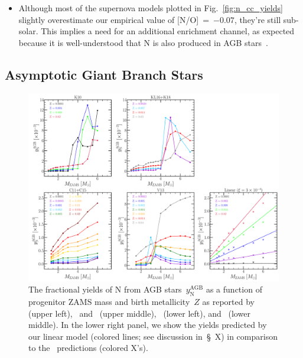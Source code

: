 \documentclass[ms.tex]{subfiles}
\begin{document}
\begin{itemize}
	\item Although most of the supernova models plotted in 
	Fig.~\ref{fig:n_cc_yields} slightly overestimate our empirical value of 
	[N/O]\subcc~=~$-0.07$, they're still sub-solar. 
	This implies a need for an additional enrichment channel, as expected 
	because it is well-understood that N is also produced in AGB 
	stars~\citep{Johnson2019}. 
\end{itemize} 

\subsection{Asymptotic Giant Branch Stars} 
\label{sec:methods:agb} 

\begin{figure} 
\centering 
\includegraphics[scale = 0.33]{agb_yield_models.pdf} 
\caption{
The fractional yields of N from AGB stars~$y_\text{N}^\text{AGB}$ as a function 
of progenitor ZAMS mass and birth metallicity~$Z$ as reported 
by~\citet{Karakas2010} (upper left),~\citet{Karakas2016} and~\citet{Karakas2018} 
(upper middle),~\citet{Cristallo2011, Cristallo2015} (lower left), 
and~\citet{Ventura2013} (lower middle). 
In the lower right panel, we show the yields predicted by our linear model 
(colored lines; see discussion in~\S~X) in comparison to 
the~\citet{Cristallo2011, Cristallo2015} predictions (colored X's). 
}
\label{fig:agb_yield_models} 
\end{figure} 
\end{document}
